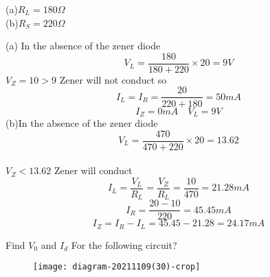 \begin{enumerate}[label=\color{futuringtheme}\textbf{\arabic*.}]
\begin{minipage}{\textwidth}
\begin{figure}[H]
		\end{figure}
		(a)$R_L=180\Omega$ \\
		(b)$R_S=220\Omega$
	\end{minipage}
	\begin{answer}
		(a) In the absence of the zener diode \\
		$$V_L=\frac{180}{180+220}\times 20=9V$$
		$V_Z=10>9$ Zener will not conduct so\\
		$$I_L=I_R=\frac{20}{220+180}=50mA$$
		$$I_Z=0mA \quad V_L=9V$$
		(b)In the absence of the zener diode\\
		$$V_L=\frac{470}{470+220}\times 20=13.62$$\\
		$V_Z<13.62$ Zener will conduct\\
		$$I_L=\frac{V_L}{R_L}=\frac{V_Z}{R_L}=\frac{10}{470}=21.28mA$$
		$$I_R=\frac{20-10}{220}=45.45mA$$
		$$I_Z=I_R-I_L=45.45-21.28=24.17mA$$
	\end{answer}
	\begin{minipage}{\textwidth}
		\item Find $V_0$ and $I_d$ For the following circuit?\\
		\begin{figure}[H]
			\centering
			\texttt{[image: diagram-20211109(30)-crop]}
		

\end{figure}
\end{minipage}
\end{enumerate}

